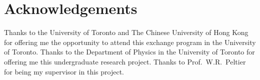 \section*{Acknowledgements}
 Thanks
to the University of Toronto and The Chinese University of Hong Kong
for offering me the opportunity to attend this exchange program in
the University of Toronto. Thanks to the Department of Physics in
the University of Toronto for offering me this undergraduate
research project. Thanks to Prof.~W.R.~Peltier for being my
supervisor in this project.

